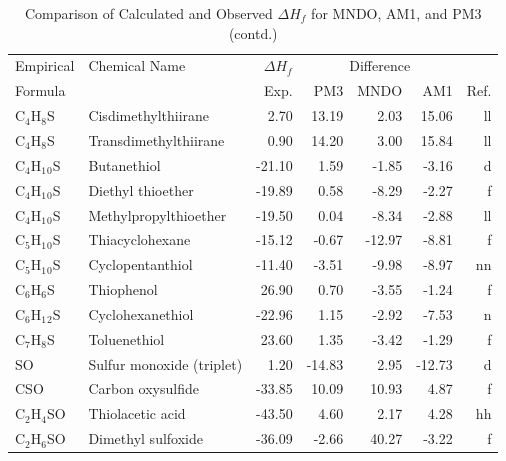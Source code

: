 \begin{table}
\caption{Comparison of Calculated and Observed $\Delta H_f$ 
for MNDO, AM1, and PM3 (contd.)}
\begin{center}
\compresstable
\begin{tabular}{llrrrrr}
Empirical & Chemical Name & $\Delta H_f$ & \multicolumn{3}{c}{Difference} & \\
Formula   &               & Exp. & PM3 &  MNDO  &  AM1 &     Ref.\\
\hline
 C$_4$H$_8$S       & Cisdimethylthiirane             &     2.70    &    13.19  &     2.03  &    15.06  &     ll\\
 C$_4$H$_8$S       & Transdimethylthiirane           &     0.90    &    14.20  &     3.00  &    15.84  &     ll\\
 C$_4$H$_1$$_0$S      & Butanethiol                     &   -21.10    &     1.59  &    -1.85  &    -3.16  &      d\\
 C$_4$H$_1$$_0$S      & Diethyl thioether               &   -19.89    &     0.58  &    -8.29  &    -2.27  &      f\\
 C$_4$H$_1$$_0$S      & Methylpropylthioether           &   -19.50    &     0.04  &    -8.34  &    -2.88  &     ll\\
 C$_5$H$_1$$_0$S      & Thiacyclohexane                 &   -15.12    &    -0.67  &   -12.97  &    -8.81  &      f\\
 C$_5$H$_1$$_0$S      & Cyclopentanthiol                &   -11.40    &    -3.51  &    -9.98  &    -8.97  &     nn\\
 C$_6$H$_6$S       & Thiophenol                      &    26.90    &     0.70  &    -3.55  &    -1.24  &      f\\
 C$_6$H$_1$$_2$S      & Cyclohexanethiol                &   -22.96    &     1.15  &    -2.92  &    -7.53  &      n\\
 C$_7$H$_8$S       & Toluenethiol                    &    23.60    &     1.35  &    -3.42  &    -1.29  &      f\\
 SO          & Sulfur monoxide (triplet)       &     1.20    &   -14.83  &     2.95  &   -12.73  &      d\\
 CSO         & Carbon oxysulfide               &   -33.85    &    10.09  &    10.93  &     4.87  &      f\\
 C$_2$H$_4$SO      & Thiolacetic acid                &   -43.50    &     4.60  &     2.17  &     4.28  &     hh\\
 C$_2$H$_6$SO      & Dimethyl sulfoxide              &   -36.09    &    -2.66  &    40.27  &    -3.22  &      f\\

\end{tabular}
\end{center}
\end{table}
